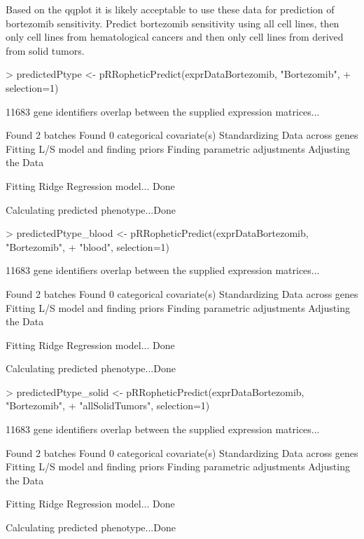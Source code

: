 \documentclass[a4paper]{article}
\begin{document}
Based on the qqplot it is likely acceptable to use these data for prediction of bortezomib sensitivity. Predict bortezomib sensitivity using all cell lines, then only cell lines from hematological cancers and then only cell lines from derived from solid tumors.
\begin{Schunk}
\begin{Sinput}
> predictedPtype <- pRRopheticPredict(exprDataBortezomib, "Bortezomib", 
+ selection=1)
\end{Sinput}
\begin{Soutput}
 11683  gene identifiers overlap between the supplied expression matrices... 
 
Found 2 batches
Found 0  categorical covariate(s)
Standardizing Data across genes
Fitting L/S model and finding priors
Finding parametric adjustments
Adjusting the Data

Fitting Ridge Regression model... Done

Calculating predicted phenotype...Done
\end{Soutput}
\begin{Sinput}
> predictedPtype_blood <- pRRopheticPredict(exprDataBortezomib, "Bortezomib", 
+ "blood", selection=1)
\end{Sinput}
\begin{Soutput}
 11683  gene identifiers overlap between the supplied expression matrices... 
 
Found 2 batches
Found 0  categorical covariate(s)
Standardizing Data across genes
Fitting L/S model and finding priors
Finding parametric adjustments
Adjusting the Data

Fitting Ridge Regression model... Done

Calculating predicted phenotype...Done
\end{Soutput}
\begin{Sinput}
> predictedPtype_solid <- pRRopheticPredict(exprDataBortezomib, "Bortezomib",
+ "allSolidTumors", selection=1)
\end{Sinput}
\begin{Soutput}
 11683  gene identifiers overlap between the supplied expression matrices... 
 
Found 2 batches
Found 0  categorical covariate(s)
Standardizing Data across genes
Fitting L/S model and finding priors
Finding parametric adjustments
Adjusting the Data

Fitting Ridge Regression model... Done

Calculating predicted phenotype...Done
\end{Soutput}
\end{Schunk}
\end{document}
